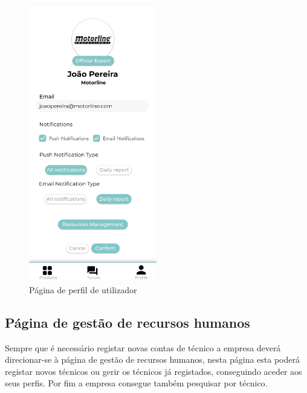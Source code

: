 \begin{figure}[htb]
    \centering
    \includegraphics[width=0.5\textwidth]{images/mockups/user_profile.png}
    \caption{Página de perfil de utilizador}
    \label{fig:30}
\end{figure}

\subsection{Página de gestão de recursos humanos}

Sempre que é necessário registar novas contas de técnico a empresa deverá direcionar-se à página de gestão
de recursos humanos, nesta página esta poderá registar novos técnicos ou gerir os técnicos já registados,
conseguindo aceder aos seus perfis. Por fim a empresa consegue também pesquisar por técnico.

